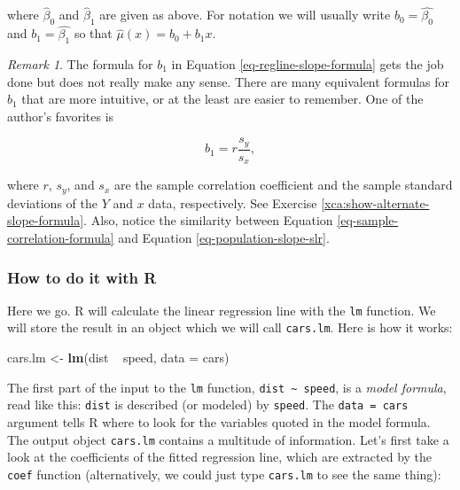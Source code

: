\documentclass[]{book}
\newenvironment{Shaded}{\begin{snugshade}}{\end{snugshade}}
\newcommand{\KeywordTok}[1]{\textcolor[rgb]{0.13,0.29,0.53}{\textbf{{#1}}}}
\newcommand{\DataTypeTok}[1]{\textcolor[rgb]{0.13,0.29,0.53}{{#1}}}
\newcommand{\StringTok}[1]{\textcolor[rgb]{0.31,0.60,0.02}{{#1}}}
\newcommand{\NormalTok}[1]{{#1}}
\numberwithin{equation}{chapter}
\numberwithin{figure}{chapter}
\theoremstyle{plain}
\theoremstyle{definition}
\theoremstyle{remark}
\newtheorem{rem}[thm]{Remark}
\theoremstyle{definition}
\theoremstyle{definition}
\theoremstyle{remark}
\begin{document}
where \(\hat{\beta}_{0}\) and \(\hat{\beta}_{1}\) are given as above.
For notation we will usually write \(b_{0} = \hat{\beta_{0}}\) and
\(b_{1}=\hat{\beta_{1}}\) so that \(\hat{\mu}(x) = b_{0} + b_{1}x\).

\bigskip

\begin{rem}
The formula for \(b_{1}\) in Equation \eqref{eq-regline-slope-formula}
gets the job done but does not really make any sense. There are many
equivalent formulas for \(b_{1}\) that are more intuitive, or at the
least are easier to remember. One of the author's favorites is

\begin{equation}
\label{eq-sample-correlation-formula} 
b_{1} = r\frac{s_{y}}{s_{x}},
\end{equation}

where \(r\), \(s_{y}\), and \(s_{x}\) are the sample correlation
coefficient and the sample standard deviations of the \(Y\) and \(x\)
data, respectively. See Exercise \ref{xca:show-alternate-slope-formula}.
Also, notice the similarity between Equation
\eqref{eq-sample-correlation-formula} and Equation
\eqref{eq-population-slope-slr}.
\end{rem}

\subsubsection{How to do it with R}\label{how-to-do-it-with-r-20}

Here we go. R will calculate the linear regression line with the
\texttt{lm} function. We will store the result in an object which we
will call \texttt{cars.lm}. Here is how it works:

\begin{Shaded}
\begin{Highlighting}[]
\NormalTok{cars.lm <-}\StringTok{ }\KeywordTok{lm}\NormalTok{(dist ~}\StringTok{ }\NormalTok{speed, }\DataTypeTok{data =} \NormalTok{cars)}
\end{Highlighting}
\end{Shaded}

The first part of the input to the \texttt{lm} function,
\texttt{dist\ \textasciitilde{}\ speed}, is a \emph{model formula}, read
like this: \texttt{dist} is described (or modeled) by \texttt{speed}.
The \texttt{data\ =\ cars} argument tells R where to look for the
variables quoted in the model formula. The output object
\texttt{cars.lm} contains a multitude of information. Let's first take a
look at the coefficients of the fitted regression line, which are
extracted by the \texttt{coef} function (alternatively, we could just
type \texttt{cars.lm} to see the same thing):
\end{document}
